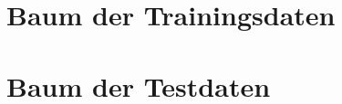 \newpage
\appendix
\section{Baum der Trainingsdaten}\label{appendix:baum-training}


\newpage
\section{Baum der Testdaten}\label{appendix:baum-test}
